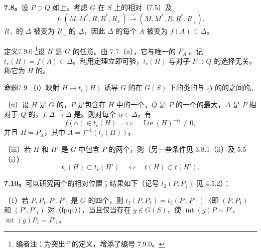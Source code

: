 \textbf{7.8。}设 $P\supset Q$ 如上。考虑 $G$ 在 $S$ 上的相对（7.5）及
\[
 f:(M,M^*,R,R^*,R_+)\xrightarrow{\sim}
 (\underline M,\underline M^*,\underline R,\underline R^*,\underline R_+).
\]
$R_+$ 的 $\Delta$ 被变为 $\underline R_+$ 的 $\underline\Delta$，因此 $\Delta$ 的每个 $A$ 被变为 $f(A)\subset\underline\Delta$。
\begin{SGAresult}{定义}{7.9.0}
\footnote{编者注：为突出“”的定义，增添了编号 7.9.0。}设 $H$ 是 $G$ 的任意。由 7.7（ii），它与唯一的 $P_A$ 。记 $t_r(H)=f(A)\subset\underline\Delta$。利用定理立即可验，$t_r(H)$ 与对子 $P\supset Q$ 的选择无关。称它为 $H$ 的。
\end{SGAresult}
\begin{SGAresult}{命题}{7.9}
（i）映射 $H\mapsto t_r(H)$ 诱导 $G$ 的在 $G(S)$ 下的类的与 $\underline\Delta$ 的的之间的。

（ii）设 $H$ 是 $G$ 的，$P$ 是包含在 $H$ 中的一个，$Q$ 是 $P$ 的一个的最大，$\Delta$ 是 $P$ 相对于 $Q$ 的，$f:\Delta\xrightarrow{\sim}\underline\Delta$ 是。则对每个 $\alpha\in\Delta$，有
\[
 f(\alpha)\in t_r(H)\quad\Longleftrightarrow\quad\operatorname{Lie}(H)^{-\alpha}\neq0,
\]
并且 $H=P_A$，其中 $A=f^{-1}(t_r(H))$。

（iii）若 $H$ 和 $H'$ 是 $G$ 中包含 $P$ 的两个，则（另一些条件见 3.8.1（ii）及 5.5（i））
\[
 t_r(H)\subset t_r(H')\quad\Longleftrightarrow\quad t(H)\subset t(H').
\]
\end{SGAresult}

\textbf{7.10。}可以研究两个的相对位置；结果如下（记号 $t_2(P,P_1)$ 见 4.5.2）：

（1）若 $P,P_1,P',P'_1$ 是 $G$ 的四个，则 $t_2(P,P_1)=t_2(P',P'_1)$（即 $(P,P_1)$ 和 $(P',P'_1)$ 对（fpqc）），当且仅当存在 $g\in G(S)$，使 $\operatorname{int}(g)P=P'$、$\operatorname{int}(g)P_1=P'_1$。

